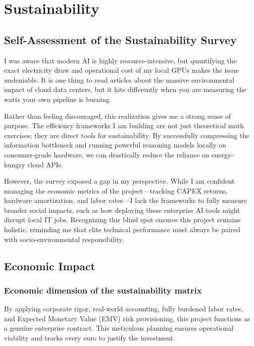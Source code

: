 \section{Sustainability}
\label{sec:sustainability}

\subsection{Self-Assessment of the Sustainability Survey}
\label{subsec:self-assessment-sustainability-survey}

I was aware that modern AI is highly resource-intensive, but quantifying the exact electricity draw and operational cost of my local GPUs makes the issue undeniable. It is one thing to read articles about the massive environmental impact of cloud data centers, but it hits differently when you are measuring the watts your own pipeline is burning. 

Rather than feeling discouraged, this realization gives me a strong sense of purpose. The efficiency frameworks I am building are not just theoretical math exercises; they are direct tools for sustainability. By successfully compressing the information bottleneck and running powerful reasoning models locally on consumer-grade hardware, we can drastically reduce the reliance on energy-hungry cloud APIs. 

However, the survey exposed a gap in my perspective. While I am confident managing the economic metrics of the project—tracking CAPEX returns, hardware amortization, and labor rates—I lack the frameworks to fully measure broader social impacts, such as how deploying these enterprise AI tools might disrupt local IT jobs. Recognizing this blind spot ensures this project remains holistic, reminding me that elite technical performance must always be paired with socio-environmental responsibility.

\subsection{Economic Impact}
\label{subsec:economic-impact}

\subsubsection{Economic dimension of the sustainability matrix}
\label{subsubsec:economic-dimension-sustainability-matrix}

By applying corporate rigor, real-world accounting, fully burdened labor rates, and Expected Monetary Value (EMV) risk provisioning, this project functions as a genuine enterprise contract. This meticulous planning ensures operational viability and tracks every euro to justify the investment.


